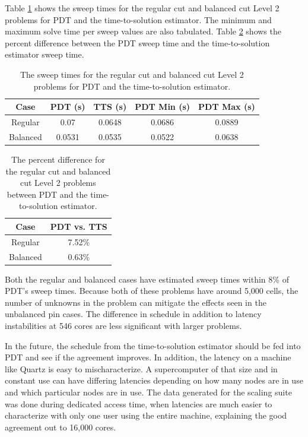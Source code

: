 Table \ref{level2_sweep_times} shows the sweep times for the regular cut and balanced cut Level 2 problems for PDT and the time-to-solution estimator. The minimum and maximum solve time per sweep values are also tabulated.
Table \ref{level2_percent_diff} shows the percent difference between the PDT sweep time and the time-to-solution estimator sweep time.
\begin{table}[ht]
\centering
\caption{The sweep times for the regular cut and balanced cut Level 2 problems for PDT and the time-to-solution estimator.}
\label{level2_sweep_times}
\begin{tabular}{c|c|c|c|c}
\bf Case & \bf PDT (s) & \bf TTS (s) & \bf PDT Min (s) & \bf PDT Max (s) \\ \hline
Regular & 0.07 & 0.0648 & 0.0686 & 0.0889\\ \hline
Balanced & 0.0531 & 0.0535 & 0.0522 & 0.0638
\end{tabular}
\end{table}
\begin{table}[ht]
\centering
\caption{The percent difference for the regular cut and balanced cut Level 2 problems between PDT and the time-to-solution estimator.}
\label{level2_percent_diff}
\begin{tabular}{c|c}
\textbf{Case} & \bf PDT vs. TTS \\ \hline
Regular & 7.52\% \\ \hline
Balanced & 0.63\%
\end{tabular}
\end{table}
Both the regular and balanced cases have estimated sweep times within 8\% of PDT's sweep times.
Because both of these problems have around 5,000 cells, the number of unknowns in the problem can mitigate the effects seen in the unbalanced pin cases.
The difference in schedule in addition to latency instabilities at 546 cores are less significant with larger problems.

In the future, the schedule from the time-to-solution estimator should be fed into PDT and see if the agreement improves.
In addition, the latency on a machine like Quartz is easy to mischaracterize.
A supercomputer of that size and in constant use can have differing latencies depending on how many nodes are in use and which particular nodes are in use.
The data generated for the scaling suite was done during dedicated access time, when latencies are much easier to characterize with only one user using the entire machine, explaining the good agreement out to 16,000 cores.

